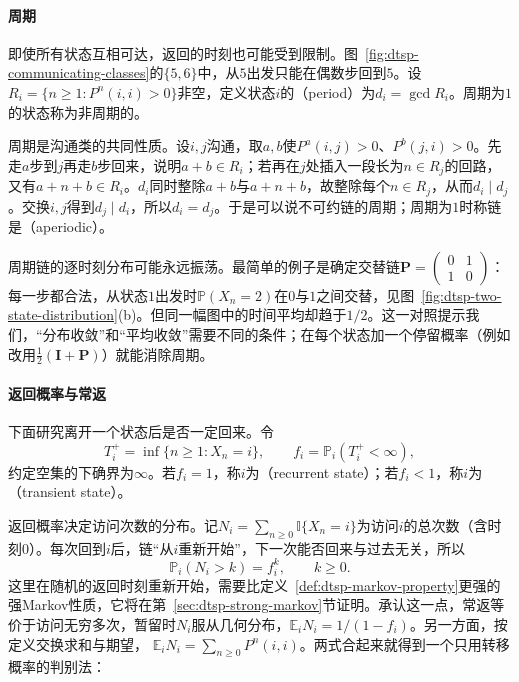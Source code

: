 \paragraph{周期}
即使所有状态互相可达，返回的时刻也可能受到限制。图~\ref{fig:dtsp-communicating-classes}的$\{5,6\}$中，从$5$出发只能在偶数步回到$5$。设$R_i=\{n\geq1:P^n(i,i)>0\}$非空，定义状态$i$的（period）为$d_i=\gcd R_i$。周期为$1$的状态称为非周期的。

周期是沟通类的共同性质。设$i,j$沟通，取$a,b$使$P^a(i,j)>0$、$P^b(j,i)>0$。先走$a$步到$j$再走$b$步回来，说明$a+b\in R_i$；若再在$j$处插入一段长为$n\in R_j$的回路，又有$a+n+b\in R_i$。$d_i$同时整除$a+b$与$a+n+b$，故整除每个$n\in R_j$，从而$d_i\mid d_j$。交换$i,j$得到$d_j\mid d_i$，所以$d_i=d_j$。于是可以说不可约链的周期；周期为$1$时称链是（aperiodic）。

周期链的逐时刻分布可能永远振荡。最简单的例子是确定交替链$\bm P=\left(\begin{smallmatrix}0&1\\1&0\end{smallmatrix}\right)$：每一步都合法，从状态$1$出发时$\mathbb P(X_n=2)$在$0$与$1$之间交替，见图~\ref{fig:dtsp-two-state-distribution}(b)。但同一幅图中的时间平均却趋于$1/2$。这一对照提示我们，“分布收敛”和“平均收敛”需要不同的条件；在每个状态加一个停留概率（例如改用$\frac12(\bm I+\bm P)$）就能消除周期。

\paragraph{返回概率与常返}
下面研究离开一个状态后是否一定回来。令
\[
  T_i^{+}=\inf\{n\geq1:X_n=i\},\qquad f_i=\mathbb P_i(T_i^{+}<\infty),
\]
约定空集的下确界为$\infty$。若$f_i=1$，称$i$为（recurrent state）；若$f_i<1$，称$i$为（transient state）。

返回概率决定访问次数的分布。记$N_i=\sum_{n\geq0}\mathbb I\{X_n=i\}$为访问$i$的总次数（含时刻$0$）。每次回到$i$后，链“从$i$重新开始”，下一次能否回来与过去无关，所以
\begin{equation}
  \mathbb P_i(N_i>k)=f_i^{k},\qquad k\geq0.
  \label{eq:dtsp-visit-geometric}
\end{equation}
这里在随机的返回时刻重新开始，需要比定义~\ref{def:dtsp-markov-property}更强的强Markov性质，它将在第~\ref{sec:dtsp-strong-markov}节证明。承认这一点，常返等价于访问无穷多次，暂留时$N_i$服从几何分布，$\mathbb E_iN_i=1/(1-f_i)$。另一方面，按定义交换求和与期望，
$\mathbb E_iN_i=\sum_{n\geq0}P^n(i,i)$。两式合起来就得到一个只用转移概率的判别法：

